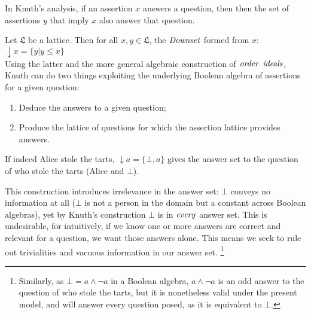 \documentclass[11pt,a4paper]{article}
\theoremstyle{definition}
\begin{document}

In Knuth's analysis, if an assertion $x$ answers a question, then then the set of assertions $y$ that imply $x$ also answer that question. 

 Let $\mathfrak{L}$ be a lattice. Then for all $x,y \in \mathfrak{L}$, the $\it{Downset}$ formed from $x$: $\downarrow x = \{y | y \le x\}$ \\
Using the latter and the more general algebraic construction of $\it{order}$ $\it{ideals}$, Knuth can do two things exploiting the underlying Boolean algebra of assertions for a given question:
\begin{enumerate}
    \item Deduce the answers to a given question;
    \item Produce the lattice of questions for which the assertion lattice provides answers.
\end{enumerate}
\example \label{sec-example}If indeed Alice stole the tarts, $\downarrow$$a = \{\bot, a\}$ gives the answer set to the question of who stole the tarts (Alice and $\bot$).\\ 
\par This construction introduces irrelevance in the answer set: $\bot$ conveys no information at all ($\bot$ is not a person in the domain but a constant across Boolean algebras), yet by Knuth's construction $\bot$ is in $\it{every}$ answer set. This is undesirable, for intuitively, if we know one or more answers are correct and relevant for a question, we want those answers alone. This means we seek to rule out trivialities and vacuous information in our answer set. \footnote{Similarly, as $\bot = a \land \neg a$ in a Boolean algebra, $a \land \neg a$ is an odd answer to the question of who stole the tarts, but it is nonetheless valid under the present model, and will answer every question posed, as it is equivalent to $\bot$.} %
\end{document}

